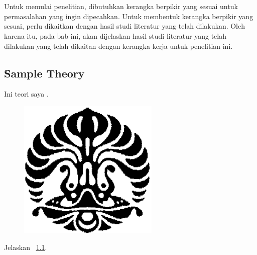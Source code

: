 \chapter{\babDua}
Untuk memulai penelitian, dibutuhkan kerangka berpikir yang sesuai untuk permasalahan yang ingin dipecahkan. Untuk membentuk kerangka berpikir yang sesuai, perlu dikaitkan dengan hasil studi literatur yang telah dilakukan. Oleh karena itu, pada bab ini, akan dijelaskan hasil studi literatur yang telah dilakukan yang telah dikaitan dengan kerangka kerja untuk penelitian ini.


\section{\f{Sample Theory}}
Ini teori saya \cite{book:test}.

\begin{figure}
	\centering
	\includegraphics[width=0.6\textwidth]{assets/pics/makara.png}
	\label{fig:sample}
\end{figure}

Jelaskan \pic~\ref{fig:sample}.



